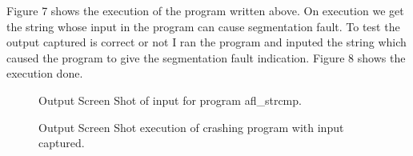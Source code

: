 \documentclass[a4paper, 12pt]{article}
\begin{document}
Figure 7 shows the execution of the program written above. On execution we get the string whose input in the program can cause segmentation fault. To test the output captured is correct or not I ran the program and inputed the string which caused the program to give the segmentation fault indication. Figure 8 shows the execution done.
\begin{figure}[h]
	\centering
	\caption{Output Screen Shot of input for program afl\_strcmp.}
\end{figure}

\begin{figure}[h]
	\centering
	\caption{Output Screen Shot execution of crashing program with input captured.}
\end{figure}
\end{document}
